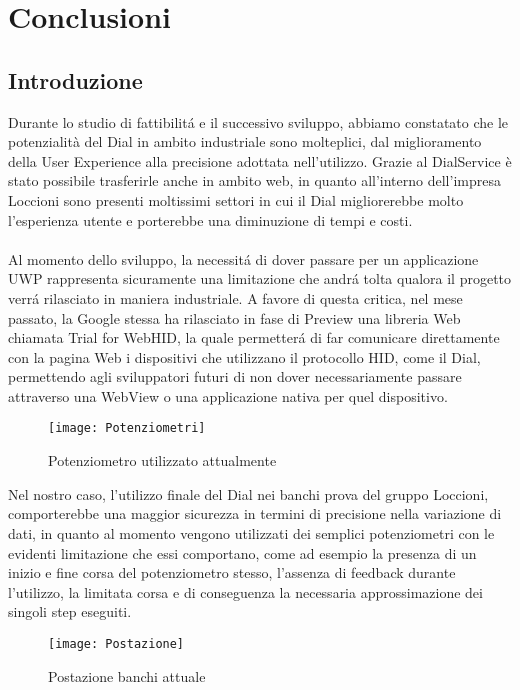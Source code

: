 \chapter{Conclusioni}
\label{chap: Conclusioni}

\section{Introduzione}
Durante lo studio di fattibilitá e il successivo sviluppo, abbiamo constatato che le potenzialità del Dial in ambito industriale sono molteplici, dal miglioramento della User Experience alla precisione adottata nell’utilizzo.
Grazie al DialService è stato possibile trasferirle anche in ambito web, in quanto all’interno dell’impresa Loccioni sono presenti moltissimi settori in cui il Dial migliorerebbe molto l’esperienza utente e porterebbe una diminuzione di tempi e costi.\\ \\
Al momento dello sviluppo, la necessitá di dover passare per un applicazione UWP rappresenta sicuramente una limitazione che andrá tolta qualora il progetto verrá rilasciato in maniera industriale.
A favore di questa critica, nel mese passato, la Google stessa ha rilasciato in fase di Preview una libreria Web chiamata Trial for WebHID, la quale permetterá di far comunicare direttamente con la pagina Web i dispositivi che utilizzano il protocollo HID, come il Dial, permettendo agli sviluppatori futuri di non dover necessariamente passare attraverso una WebView o una applicazione nativa per quel dispositivo.\\

\begin{figure}[htpb!]
\center
  \texttt{[image: Potenziometri]}
  \caption{Potenziometro utilizzato attualmente}
\end{figure}

Nel nostro caso, l’utilizzo finale del Dial nei banchi prova del gruppo Loccioni, comporterebbe una maggior sicurezza in termini di precisione nella variazione di dati, in quanto al momento vengono utilizzati dei semplici potenziometri con le evidenti limitazione che essi comportano, come ad esempio la presenza di un inizio e fine corsa del potenziometro stesso, l’assenza di feedback durante l’utilizzo, la limitata corsa e di conseguenza la necessaria approssimazione dei singoli step eseguiti.

\begin{figure}[htpb!]
\center
\texttt{[image: Postazione]}
\caption{Postazione banchi attuale}
\end{figure}

